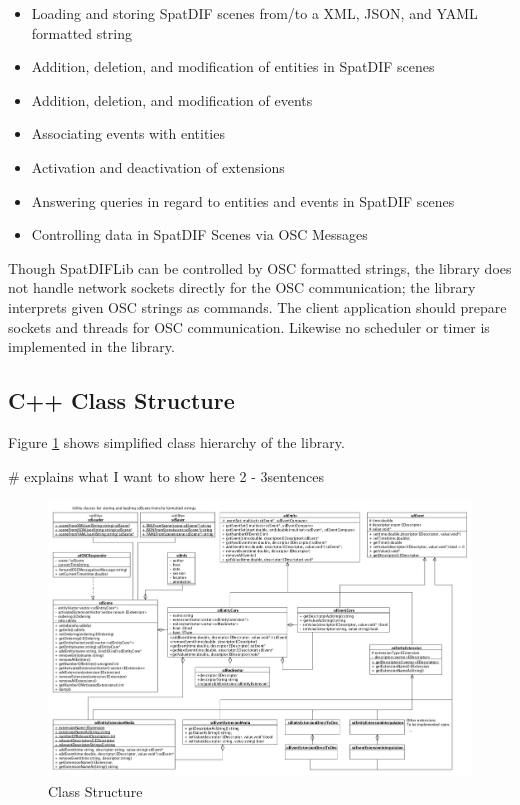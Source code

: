 \documentclass[a4paper]{article}
\begin{document}
\begin{itemize}
\item Loading and storing SpatDIF scenes from/to a XML, JSON, and YAML formatted string
\item Addition, deletion, and modification of entities in SpatDIF scenes
\item Addition, deletion, and modification of events
\item Associating events with entities
\item Activation and deactivation of extensions
\item Answering queries in regard to entities and events in SpatDIF scenes
\item Controlling data in SpatDIF Scenes via OSC Messages
\end{itemize}

Though SpatDIFLib can be controlled by OSC formatted strings, the library does not handle network sockets directly for the OSC communication; the library interprets given OSC strings as commands. The client application should prepare sockets and threads for OSC communication. Likewise no scheduler or timer is implemented in the library. 
  
\subsection{C++ Class Structure}
Figure \ref{fig:class_structure} shows simplified class hierarchy of the library. 

# explains what I want to show here 2 - 3sentences

\begin{figure}[t]
\centerline{
	\includegraphics[width= 17.5cm]{classes.pdf}}
\caption{Class Structure }
\label{fig:class_structure}
\end{figure}
\end{document}
